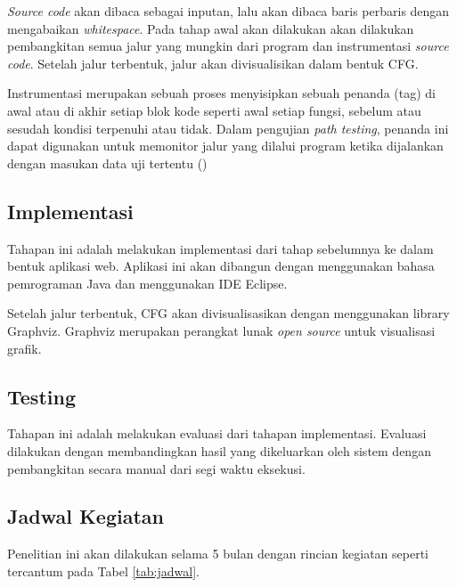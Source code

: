 \textit{Source code} akan dibaca sebagai inputan, lalu akan dibaca baris perbaris  dengan mengabaikan \textit{whitespace}. Pada tahap awal akan dilakukan akan dilakukan pembangkitan semua jalur yang mungkin dari program dan instrumentasi \textit{source code}. Setelah jalur terbentuk, jalur akan divisualisikan dalam bentuk CFG. 

Instrumentasi merupakan sebuah proses menyisipkan sebuah penanda (tag) di awal atau di akhir setiap blok kode seperti awal setiap fungsi, sebelum atau sesudah kondisi terpenuhi atau tidak. Dalam pengujian \textit{path testing}, penanda ini dapat digunakan untuk memonitor jalur yang dilalui program ketika dijalankan dengan masukan data uji tertentu (\cite{IRH2014})

\subsection*{Implementasi}

Tahapan ini adalah melakukan implementasi dari tahap sebelumnya ke dalam bentuk aplikasi web. Aplikasi ini akan dibangun dengan menggunakan bahasa pemrograman Java dan menggunakan IDE Eclipse. 

Setelah jalur terbentuk, CFG akan divisualisasikan dengan menggunakan library Graphviz. Graphviz merupakan perangkat lunak \textit{open source} untuk visualisasi grafik.

\subsection*{Testing}

Tahapan ini adalah melakukan evaluasi dari tahapan implementasi. Evaluasi dilakukan dengan membandingkan hasil yang dikeluarkan oleh sistem dengan pembangkitan secara manual dari segi waktu eksekusi. 

\subsection*{Jadwal Kegiatan}

Penelitian ini akan dilakukan selama 5 bulan dengan rincian kegiatan seperti tercantum pada Tabel \ref{tab:jadwal}.

